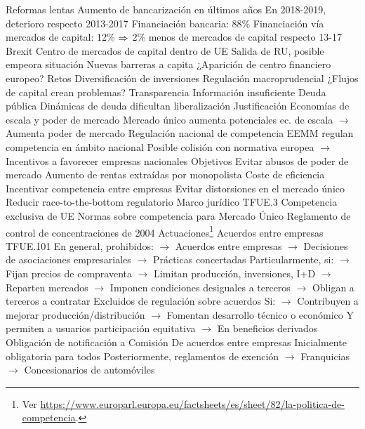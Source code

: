 \documentclass{nuevotema}
\begin{document}
\begin{esquemal}
			\3 Reformas lentas
			\3 Aumento de bancarización en últimos años
				\4 En 2018-2019, deterioro respecto 2013-2017
				\4[] Financiación bancaria: 88\%
				\4[] Financiación vía mercados de capital: 12\%
				\4[] $\Rightarrow$ 2\% menos de mercados de capital respecto 13-17
			\3 Brexit
				\4 Centro de mercados de capital dentro de UE
				\4 Salida de RU, posible empeora situación
				\4[] Nuevas barreras a capita
				\4 ¿Aparición de centro financiero europeo?
		\2 Retos
			\3 Diversificación de inversiones
			\3 Regulación macroprudencial
				\4 ¿Flujos de capital crean problemas?
			\3 Transparencia
				\4 Información insuficiente
			\3 Deuda pública
				\4 Dinámicas de deuda dificultan liberalización
	\1 
		\2 Justificación
			\3 Economías de escala y poder de mercado
				\4 Mercado único aumenta potenciales ec. de escala
				\4[] $\to$ Aumenta poder de mercado
			\3 Regulación nacional de competencia
				\4 EEMM regulan competencia en ámbito nacional
				\4 Posible colisión con normativa europea
				\4[] $\to$ Incentivos a favorecer empresas nacionales
		\2 Objetivos
			\3 Evitar abusos de poder de mercado
				\4 Aumento de rentas extraídas por monopolista
				\4 Coste de eficiencia
			\3 Incentivar competencia entre empresas
			\3 Evitar distorsiones en el mercado único
			\3 Reducir race-to-the-bottom regulatorio
		\2 Marco jurídico
			\3 TFUE.3
				\4 Competencia exclusiva de UE
				\4[] Normas sobre competencia para Mercado Único
			\3 Reglamento de control de concentraciones de 2004
		\2 Actuaciones\footnote{Ver \url{https://www.europarl.europa.eu/factsheets/es/sheet/82/la-politica-de-competencia}.}
			\3 Acuerdos entre empresas
				\4 TFUE.101
				\4 En general, prohibidos:
				\4[] $\to$ Acuerdos entre empresas
				\4[] $\to$ Decisiones de asociaciones empresariales
				\4[] $\to$ Prácticas concertadas
				\4 Particularmente, si:
				\4[] $\to$ Fijan precios de compraventa
				\4[] $\to$ Limitan producción, inversiones, I+D
				\4[] $\to$ Reparten mercados
				\4[] $\to$ Imponen condiciones desiguales a terceros
				\4[] $\to$ Obligan a terceros a contratar
				\4 Excluidos de regulación sobre acuerdos
				\4[] Si:
				\4[] $\to$ Contribuyen a mejorar producción/distribución
				\4[] $\to$ Fomentan desarrollo técnico o económico
				\4[] Y permiten a usuarios participación equitativa
				\4[] $\to$ En beneficios derivados
				\4 Obligación de notificación a Comisión
				\4[] De acuerdos entre empresas
				\4[] Inicialmente obligatoria para todos
				\4[] Posteriormente, reglamentos de exención
				\4[] $\to$ Franquicias
				\4[] $\to$ Concesionarios de automóviles

\end{esquemal}
\end{document}
